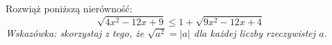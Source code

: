 Rozwiąż poniższą nierówność:
\[
	\sqrt{4x^{2}-12x+9}\leq 1+\sqrt{9x^{2}-12x+4}
\]
\emph{Wskazówka: skorzystaj z tego, że $\sqrt{a^2} = |a|$ dla każdej liczby rzeczywistej $a$.}